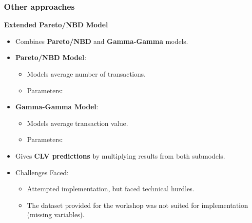 \documentclass[aspectratio=169,xcolor=x11names,compress]{beamer}
\begin{document}
\begin{frame}
\frametitle{Other approaches}

\textbf{Extended Pareto/NBD Model}

\begin{itemize}
  \item Combines \textbf{Pareto/NBD} and \textbf{Gamma-Gamma} models.
  
  \item \textbf{Pareto/NBD Model}:
  \begin{itemize}
    \item Models average number of transactions.
    \item Parameters: 
  \end{itemize}
  
  \item \textbf{Gamma-Gamma Model}:
  \begin{itemize}
    \item Models average transaction value.
    \item Parameters: 
  \end{itemize}
  
  \item Gives \textbf{CLV predictions} by multiplying results from both submodels.
  
  \item Challenges Faced:
  \begin{itemize}
    \item Attempted implementation, but faced technical hurdles.
    \item The dataset provided for the workshop was not suited for implementation (missing variables).
  \end{itemize}
\end{itemize}

\end{frame}
\end{document}
